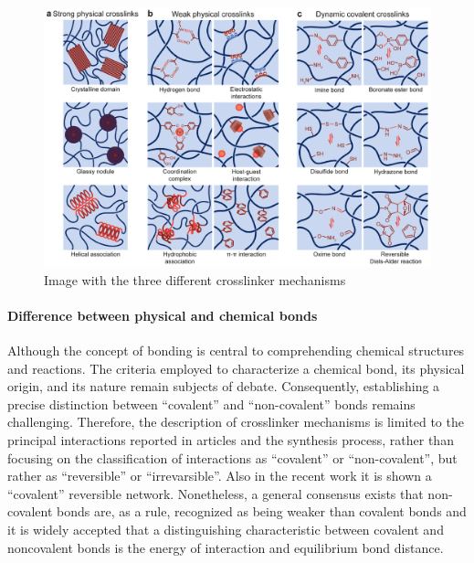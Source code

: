 \begin{figure}[!ht]
    \centering
    \includegraphics[width=\textwidth]{figs/crosslinker_mechanisms.png}
    \caption{Image with the three different crosslinker mechanisms}
\end{figure}


\paragraph{Difference between physical and chemical bonds}
Although the concept of bonding is central to comprehending chemical structures and reactions.
The criteria employed to characterize a chemical bond, its physical origin, and its nature remain subjects of debate\citep{kumarDevelopingCriterionCharacterize2021}.
Consequently, establishing a precise distinction between ``covalent'' and ``non-covalent'' bonds remains challenging.
Therefore, the description of crosslinker mechanisms is limited to the principal interactions reported in articles and the synthesis process, rather than focusing on the classification of interactions as ``covalent'' or ``non-covalent'', but rather as ``reversible'' or ``irrevarsible''.
Also in the recent work \citep{picchioniHydrogelsBasedDynamic2018} it is shown a ``covalent'' reversible network. 
Nonetheless, a general consensus exists that non-covalent bonds are, as a rule, recognized as being weaker than covalent bonds and it is widely accepted that a distinguishing characteristic between covalent and noncovalent bonds is the energy of interaction and equilibrium bond distance\citep{kumarDevelopingCriterionCharacterize2021,novikovNonCovalentInteractionsPolymers2023}.

